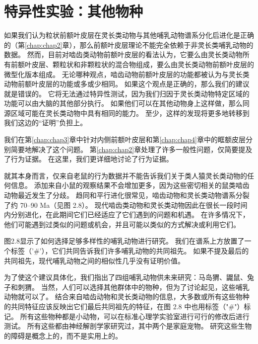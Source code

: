\section{特异性实验：其他物种}

如果我们认为粒状前额叶皮层在灵长类动物与其他哺乳动物谱系分化后进化是正确的（第\ref{chap:chap2}章），那么前额叶皮层理论不能完全依赖于非灵长类哺乳动物的数据。
然而，目前对啮齿类动物前额叶皮层的看法认为，它要么由灵长类动物所有前额叶皮层、颗粒状和非颗粒状的混合物组成，要么由灵长类动物前额叶皮层的微型化版本组成。
无论哪种观点，啮齿动物前额叶皮层的功能都被认为与灵长类动物前额叶皮层的功能或多或少相同。
如果这个观点是正确的，那么我们的建议就是错误的。
它将无法通过特异性测试，因为我们归因于灵长类动物特定区域的功能可以由大脑的其他部分执行。
如果他们可以在其他动物身上这样做，那么同源区域可能在灵长类动物中具有相同的能力。
至少，这样的发现将更多地转移到我们这边的“证明”负担上。
\par

我们在第\ref{chap:chap3}章中针对内侧前额叶皮层和第\ref{chap:chap4}章中的眶额皮层分别简要地解决了这个问题。 
第\ref{chap:chap2}章处理了许多一般性问题，仅简要提及了行为证据。
在这里，我们更详细地讨论了行为证据。
\par


就其本身而言，仅来自老鼠的行为数据并不能告诉我们关于类人猿灵长类动物的任何信息。
添加来自小鼠的观察结果不会增加更多，因为这些密切相关的鼠类啮齿动物最近发生了分歧。
趋同和平行进化很常见，啮齿动物和灵长类动物谱系分裂了约 70–90 Ma（见图 2.8）。
现代啮齿类动物和灵长类动物因此在很长一段时间内分别进化，在此期间它们已经适应了它们遇到的问题和机遇。
在许多情况下，他们可能遇到过类似的问题或机会，并且可能以类似的方式解决或利用它们。
\par


图2.8显示了如何选择足够多样性的哺乳动物进行研究。
我们在谱系上方放置了一个标签（'$\#$'），它们共同告诉我们许多哺乳动物的共同祖先。
如果不提及最后的共同祖先，现代哺乳动物之间的相似性几乎没有证明价值。
\par


为了使这个建议具体化，我们指出了四组哺乳动物供未来研究：马岛猬、鼹鼠、兔子和刺猬。
当然，人们可以选择其他群体中的物种，但为了讨论起见，这些哺乳动物就可以了。
结合来自啮齿动物和灵长类动物的信息，大多数或所有这些物种的共同特征应该反映出它们最后共同祖先的特征，在图 2.8 中也用标签（"$\#$"）标记。
所有这些物种都是小动物，可以在标准心理学实验室进行可行的修改后进行测试。
所有这些都由神经解剖学家研究过，其中两个是家庭宠物。
研究这些生物的障碍是概念上的，而不是实用上的。
\par


